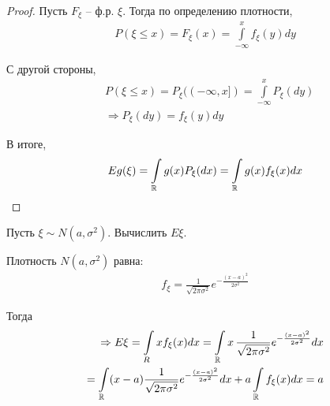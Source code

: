\begin{corollary}
\begin{enumerate}[label=\protect\circled{\arabic*},series=lebesgue_corollary]
      \begin{proof}
        Пусть $F_{\xi}$ -- ф.р. $\xi$. 
        Тогда по определению плотности,
        \begin{align*}
          P(\xi \leq x) = F_{\xi} (x) = \int\limits_{-\infty}^{x} f_{\xi} (y) dy
        \end{align*}

        С другой стороны,
        \begin{align*}
          &P(\xi \leq x) = P_{\xi} ((-\infty, x]) = \int\limits_{-\infty}^{x} P_{\xi} (dy)\\
          &\Rightarrow P_{\xi}(dy) = f_{\xi} (y) dy
        \end{align*}

        В итоге,
        \begin{align*}
          E g(\xi) = \int\limits_{\mathbb{R}} g(x) P_{\xi} (dx) 
          = \int\limits_{\mathbb{R}} g(x) f_{\xi} (x) dx
        \end{align*}

      \end{proof}

      \begin{example}
        Пусть $\xi \sim N(a, \sigma^2)$. Вычислить $E \xi$.

        Плотность $N(a, \sigma^2)$ равна:
        \begin{align*}
          f_\xi = \frac{1}{\sqrt{2 \pi \sigma^2}} e^{- \frac{(x - a)^2}{2\sigma^2}}
        \end{align*}

        Тогда
        \begin{align*}
          \Rightarrow E \xi = \int\limits_{R} x f_{\xi} (x) dx 
          = \int\limits_{\mathbb{R}} x\, \frac{1}{\sqrt{2 \pi \sigma^2}}
            e^{- \frac{(x - a)^2}{2\sigma^2}} dx\\
          = \int\limits_{\mathbb{R}} (x - a) \frac{1}{\sqrt{2 \pi \sigma^2}} 
            e^{- \frac{(x - a)^2}{2\sigma^2}} dx + a \int\limits_{\mathbb{R}} f_{\xi} (x) dx = a
        \end{align*}
      \end{example}

  \end{enumerate}
\end{corollary}


